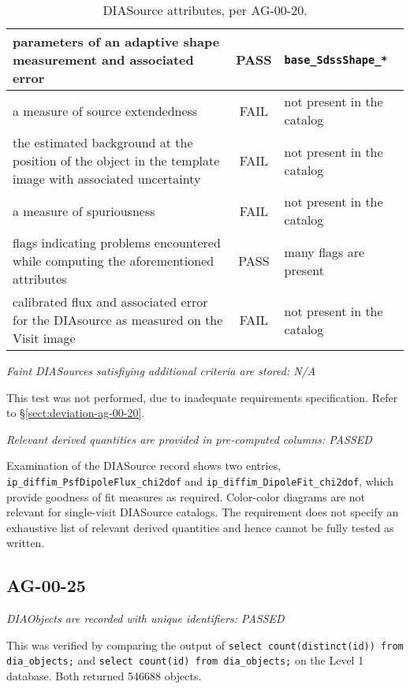 \documentclass[DM,STR,toc]{lsstdoc}
\begin{document}
\begin{table}[h]
\begin{tabular}{|p{}|c|p{}|}
        \hline
        parameters of an adaptive shape measurement and associated error & PASS & \texttt{base\_SdssShape\_*} \\
        \hline
        a measure of source extendedness & FAIL & not present in the catalog \\
        \hline
        the estimated background at the position of the object in the template image with associated uncertainty & FAIL & not present in the catalog \\
        \hline
        a measure of spuriousness & FAIL &  not present in the catalog \\
        \hline
        flags indicating problems encountered while computing the aforementioned attributes & PASS & many flags are present \\
        \hline
        calibrated flux and associated error for the DIAsource as measured on the Visit image & FAIL & not present in the catalog \\
        \hline
    \end{tabular}
    \caption{DIASource attributes, per AG-00-20. \label{tab:diasrc}}
\end{table}

\textit{Faint DIASources satisfiying additional criteria are stored: N/A}

This test was not performed, due to inadequate requirements specification. Refer to \S\ref{sect:deviation-ag-00-20}.

\textit{Relevant derived quantities are provided in pre-computed columns: PASSED}

Examination of the DIASource record shows two entries,
\texttt{ip\_diffim\_PsfDipoleFlux\_chi2dof} and
\texttt{ip\_diffim\_DipoleFit\_chi2dof}, which provide goodness of fit measures
as required.  Color-color diagrams are not relevant for single-visit DIASource
catalogs. The requirement does not specify an exhaustive list of relevant
derived quantities and hence cannot be fully tested as written.

\subsection{AG-00-25}
\label{sect:ag-00-25}

\textit{DIAObjects are recorded with unique identifiers: PASSED}

This was verified by comparing the output of \texttt{select count(distinct(id))
from dia\_objects;} and \texttt{select count(id) from dia\_objects;} on the
Level 1 database. Both returned 546688 objects.
\end{document}
